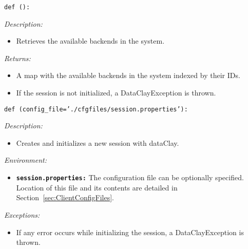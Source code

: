 
\begin{dBox}
\label{call:PythonGetBackends}
\texttt{def (): }
\LINE

{\it Description:}

\begin{itemize}
    \item Retrieves the available backends in the system.
\end{itemize}

{\it Returns:}

\begin{itemize}
    \item A map with the available backends in the system indexed by their IDs.
\end{itemize}

\begin{itemize}
    \item If the session is not initialized, a DataClayException is thrown.
\end{itemize}

\end{dBox}



\begin{dBox}
\texttt{def (config\_file='./cfgfiles/session.properties'):}
\LINE

{\it Description:}

\begin{itemize}
    \item Creates and initializes a new session with dataClay.
\end{itemize}

{\it Environment:}

\begin{itemize}
    \item \texttt{\bfseries session.properties:} The configuration file can be optionally specified. Location of this file and its contents are detailed in Section~\ref{sec:ClientConfigFiles}.
\end{itemize}

{\it Exceptions:}

\begin{itemize}
    \item If any error occurs while initializing the session, a DataClayException is thrown.
\end{itemize}
 
\end{dBox}

